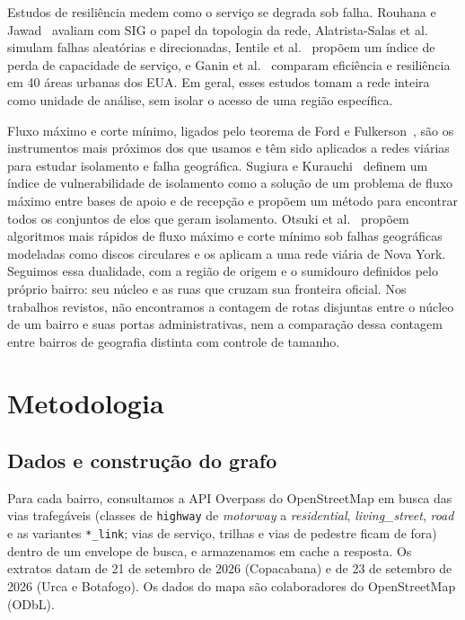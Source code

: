 Estudos de resiliência medem como o serviço se degrada sob falha. Rouhana
e Jawad~\cite{rouhana2020} avaliam com SIG o papel da topologia da rede,
Alatrista-Salas et al. simulam falhas aleatórias e direcionadas, Ientile
et al.~\cite{ientile2022measuring} propõem um índice de perda de
capacidade de serviço, e Ganin et al.~\cite{ganin2017resilience} comparam
eficiência e resiliência em 40 áreas urbanas dos EUA. Em geral, esses
estudos tomam a rede inteira como unidade de análise, sem isolar o acesso
de uma região específica.

Fluxo máximo e corte mínimo, ligados pelo teorema de Ford e
Fulkerson~\cite{ford1956maximal}, são os instrumentos mais próximos dos
que usamos e têm sido aplicados a redes viárias para estudar isolamento e
falha geográfica. Sugiura e Kurauchi~\cite{sugiura2023isolation} definem
um índice de vulnerabilidade de isolamento como a solução de um problema
de fluxo máximo entre bases de apoio e de recepção e propõem um método
para encontrar todos os conjuntos de elos que geram isolamento. Otsuki et
al.~\cite{otsuki2016improved} propõem algoritmos mais rápidos de fluxo
máximo e corte mínimo sob falhas geográficas modeladas como discos
circulares e os aplicam a uma rede viária de Nova York. Seguimos essa
dualidade, com a região de origem e o sumidouro definidos pelo próprio
bairro: seu núcleo e as ruas que cruzam sua fronteira oficial. Nos
trabalhos revistos, não encontramos a contagem de rotas disjuntas entre o
núcleo de um bairro e suas portas administrativas, nem a comparação
dessa contagem entre bairros de geografia distinta com controle de
tamanho.

\section{Metodologia}
\label{sec:method}

\subsection{Dados e construção do grafo}
\label{sec:data}

Para cada bairro, consultamos a API Overpass do OpenStreetMap em busca
das vias trafegáveis (classes de \texttt{highway} de \emph{motorway} a
\emph{residential}, \emph{living\_street}, \emph{road} e as variantes
\texttt{*\_link}; vias de serviço, trilhas e vias de pedestre ficam de
fora) dentro de um envelope de busca, e armazenamos em cache a resposta.
Os extratos datam de 21 de setembro de 2026 (Copacabana) e de 23 de
setembro de 2026 (Urca e Botafogo). Os dados do mapa são
\textcopyright{} colaboradores do OpenStreetMap (ODbL).

